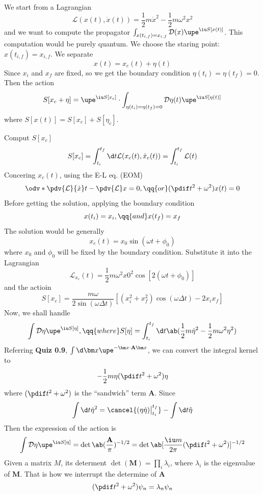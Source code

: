 We start from a Lagrangian
\begin{equation}
  \mathcal L(x(t), \dot x(t)) = \frac12m\dot x^2 - \frac12m\omega^2 x^2
\end{equation}
and we want to compute the propagator
$\int_{x(t_{i,f}) = x_{i,f}} \mathcal D(x) \upe^{\iu S[x(t)]}$.
This computation would be purely quantum.
We choose the staring point: $x(t_{i,f}) = x_{i,f}$.
We separate
\[
  x(t) = x_c(t) + \eta(t)
\]
Since $x_i$ and $x_f$ are fixed, so we get the boundary condition $\eta(t_i) = \eta(t_f) = 0$. Then the action
\[
  S[x_c + \eta]
= \upe^{\iu S[x_c]} \cdot \int_{\eta(t_i) = \eta(t_f) = 0} \mathcal D\eta(t) \upe^{\iu S{[\eta(t)]}}
\]
where $S[x(t)] = S[x_c] + S[\eta_c]$.
\begin{enumext}
  \item Comput $S[x_c]$
  \[
    S[x_c] = \int_{t_i}^{t_f} \d t \mathcal L(x_c(t), \dot x_c(t))
  = \int_{t_i}^{t_f} \mathcal L(t)
  \]
  Concering $x_c(t)$, using the E-L eq. (EOM)
  \[
    \odv*{\pdv{\mathcal L}{\dot x}}t - \pdv{\mathcal L}x = 0, \qq{or}
    (\pdif t^2 + \omega^2) x(t) = 0
  \]
  Before getting the solution, applying the boundary condition
  \[
    x(t_i) = x_i, \qq{and} x(t_f) = x_f
  \]
  The solution would be generally
  \[
    x_c(t) = x_0 \sin(\omega t + \phi_0)
  \]
  where $x_0$ and $\phi_0$ will be fixed by the boundary condition.
  Substitute it into the Lagrangian
  \[
    \mathcal L_{x_c}(t) = \frac12 m\omega^2 x0^2 \cos[2(\omega t + \phi_0)]
  \]
  and the actioin
  \[
    S[x_c] = \frac{m\omega}{2\sin(\omega\Delta t)}
             [(x_i^2 + x_f^2) \cos(\omega\Delta t) - 2x_ix_f]
  \]
  Now, we shall handle
  \[
    \int \mathcal D\eta \upe^{\iu S[\eta]}, \qq{where}
    S[\eta] = \int_{t_i}^{t_f} \d t
              \ab(\frac12 m\dot\eta^2 - \frac12 m\omega^2\eta^2)
  \]
  Referring \textbf{\textsf{Quiz 0.9}},
  $\int \d\bm x \upe^{-\bm x \cdot \mathbf A \bm x}$, we can convert the integral kernel to
  \[
    -\frac12 m\eta (\pdif t^2 + \omega^2) \eta
  \]
  where $(\pdif t^2 + \omega^2)$ is the ``sandwich'' term $\mathbf A$.
  Since
  \[
    \int \d t \dot\eta^2 = \cancel{(\eta\dot\eta)\big|_{t_i}^{t_f}}
  - \int \d t \ddot\eta
  \]
  Then the expression of the action is
  \[
    \int \mathcal D \eta \upe^{\iu S[\eta]}
  = \det\ab(\frac{\mathbf A}{\pi})^{-1/2}
  = \det\ab[\frac{\iu m}{2\pi}(\pdif t^2 + \omega^2)]^{-1/2}
  \]
  Given a matrix $M$, its determent $\det(\mathbf M) = \prod_i \lambda_i$,
  where $\lambda_i$ is the eigenvalue of $\mathbf M$. That is how we interrupt the determine of $\mathbf A$
  \[
    (\pdif t^2 + \omega^2)\psi_n = \lambda_n \psi_n
\]
\end{enumext}
